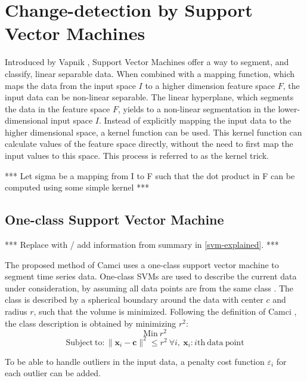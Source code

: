 \section{Change-detection by Support Vector Machines}\label{svm}

Introduced by Vapnik \cite{vapnik1998statistical, vapnik1999nature}, Support Vector Machines offer a way to segment, and classify, linear separable data.
When combined with a mapping function, which maps the data from the input space $I$ to a higher dimension feature space $F$, the input data can be non-linear separable.
The linear hyperplane, which segments the data in the feature space $F$, yields to a non-linear segmentation in the lower-dimensional input space $I$.
Instead of explicitly mapping the input data to the higher dimensional space, a kernel function can be used.
This kernel function can calculate values of the feature space directly, without the need to first map the input values to this space.
This process is referred to as the kernel trick.

*** Let sigma be a mapping from I to F such that the dot product in F can be computed using some simple kernel ***

\subsection{One-class Support Vector Machine}

*** Replace with / add information from summary in \ref{svm-explained}. ***

The proposed method of Camci \cite{camci2010change} uses a one-class support vector machine to segment time series data.
One-class SVMs are used to describe the current data under consideration, by assuming all data points are from the same class \cite{tax2001one}.
The class is described by a spherical boundary around the data with center $c$ and radius $r$, such that the volume is minimized.
Following the definition of Camci \cite{camci2010change}, the class description is obtained by minimizing $r^2$:
\begin{equation}
  \mathrm{Min}\ r^2
\end{equation}
\begin{equation}
  \mathrm{Subject\ to} : \|\mathbf{x}_i - \mathbf{c}\|^2 \le r^2\ \forall i,\ \mathbf{x}_i : i \mathrm{th\ data\ point}
\end{equation}

To be able to handle outliers in the input data, a penalty cost function $\varepsilon_i$ for each outlier can be added.


